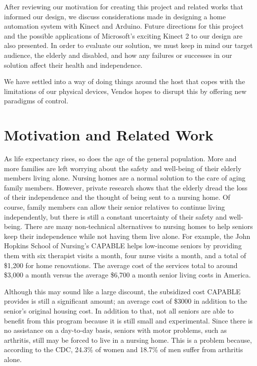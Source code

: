 \documentclass{chi-ext}
\begin{document}
After reviewing our motivation for creating this project and related works that informed our design, we discuss considerations made in designing a home automation system with Kinect and Arduino.
Future directions for this project and the possible applications of Microsoft's exciting Kinect 2 to our design are also presented.
In order to evaluate our solution, we must keep in mind our target audience, the elderly and disabled, and how any failures or successes in our solution affect their health and independence.

We have settled into a way of doing things around the host that copes with the limitations of our physical devices, Vendos hopes to disrupt this by offering new paradigms of control.

\section{Motivation and Related Work}
As life expectancy rises\cite{_life}, so does the age of the general population.
More and more families are left worrying about the safety and well-being of their elderly members living alone.
Nursing homes are a normal solution to the care of aging family members.
However, private research shows that the elderly dread the loss of their independence and the thought of being sent to a nursing home\cite{_seniors, _caregiving}.
Of course, family members can allow their senior relatives to continue living independently, but there is still a constant uncertainty of their safety and well-being\cite{_caregiving}.
There are many non-technical alternatives to nursing homes to help seniors keep their independence while not having them live alone.
For example, the John Hopkins School of Nursing's CAPABLE helps low-income seniors by providing them with six therapist visits a month, four nurse visits a month, and a total of \$1,200 for home renovations\cite{_nursing}.
The average cost of the services total to around \$3,000 a month versus the average \$6,700 a month senior living costs in America\cite{_forbes}.

Although this may sound like a large discount, the subsidized cost CAPABLE provides is still a significant amount;
an average cost of \$3000 in addition to the senior's original housing cost.
In addition to that, not all seniors are able to benefit from this program because it is still small and experimental.
Since there is no assistance on a day-to-day basis, seniors with motor problems, such as arthritis, still may be forced to live in a nursing home.
This is a problem because, according to the CDC, 24.3\% of women and 18.7\% of men suffer from arthritis\cite{_cdc} alone.
\end{document}
